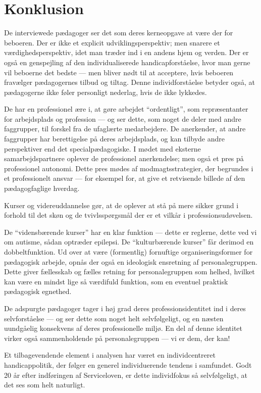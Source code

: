 \section{Konklusion}
De interviewede pædagoger ser det som deres kerneopgave at være der for beboeren.
Der er ikke et explicit udviklingsperspektiv; men snarere et værdighedsperspektiv, idet man træder ind i en andens hjem og verden.
Der er også en genspejling af den individualiserede handicapforståelse, hvor man gerne vil beboerne det bedste — men bliver nødt til at acceptere, hvis beboeren fravælger pædagogernes tilbud og tiltag.
Denne individforståelse betyder også, at pædagogerne ikke føler personligt nederlag, hvis de ikke lykkedes.

De har en professionel ære i, at gøre arbejdet “ordentligt”, som repræsentanter for arbejdsplads og profession — og ser dette, som noget de deler med andre faggrupper, til forskel fra de ufaglærte medarbejdere.
De anerkender, at andre faggrupper har berettigelse på deres arbejdsplads, og kan tilbyde andre perspektiver end det specialpædagogiske.
I mødet med eksterne samarbejdspartnere oplever de professionel anerkendelse; men også et pres på professionel autonomi.
Dette pres mødes af modmagtsstrategier, der begrundes i et professionelt ansvar — for eksempel for, at give et retvisende billede af den pædagogfaglige hverdag.

Kurser og videreuddannelse gør, at de oplever at stå på mere sikker grund i forhold til det skøn og de tvivlsspørgsmål der er et vilkår i professionsudøvelsen.

De “vidensbærende kurser” har en klar funktion — dette er reglerne, dette ved vi om autisme, sådan optræder epilepsi.
De “kulturbærende kurser” får derimod en dobbeltfunktion.
Ud over at være (formentlig) fornuftige organiseringsformer for pædagogisk arbejde, opnås der også en ideologisk ensretning af personalegruppen.
Dette giver fællesskab og fælles retning for personalegruppen som helhed, hvilket kan være en mindst lige så værdifuld funktion, som en eventuel praktisk pædagogisk egnethed.

De adspurgte pædagoger tager i høj grad deres professionsidentitet ind i deres selvforståelse — og ser dette som noget helt selvfølgeligt, og en næsten uundgåelig konsekvens af deres professionelle miljø.
En del af denne identitet virker også sammenholdende på personalegruppen — vi er dem, der kan!

Et tilbagevendende element i analysen har været en individcentreret handicappolitik, der følger en generel individuerende tendens i samfundet.
Godt 20 år efter indføringen af Serviceloven, er dette individfokus så selvfølgeligt, at det ses som helt naturligt.

